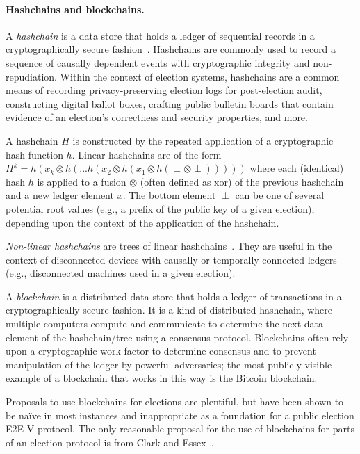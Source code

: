 \paragraph{Hashchains and blockchains.} A \emph{hashchain} is a data
store that holds a ledger of sequential records in a cryptographically
secure fashion~\cite{Haber90}. Hashchains are commonly used to record
a sequence of causally dependent events with cryptographic integrity
and non-repudiation. Within the context of election systems,
hashchains are a common means of recording privacy-preserving election
logs for post-election audit, constructing digital ballot boxes,
crafting public bulletin boards that contain evidence of an election's
correctness and security properties, and more.

A hashchain $H$ is constructed by the repeated application of a
cryptographic hash function $h$. Linear hashchains are of the form
$H^{k}=h(x_{k} \otimes h(...h(x_{2} \otimes h(x_{1} \otimes h(\perp
\otimes \perp)))))$
where each (identical) hash $h$ is applied to a fusion $\otimes$
(often defined as xor) of the previous hashchain and a new ledger
element $x$. The bottom element $\perp$ can be one of several
potential root values (e.g., a prefix of the public key of a given
election), depending upon the context of the application of the
hashchain. 

\emph{Non-linear hashchains} are trees of linear
hashchains~\cite{Benaloh91,Bayer93}. They are useful in the context of
disconnected devices with causally or temporally connected ledgers
(e.g., disconnected machines used in a given election).

A \emph{blockchain} is a distributed data store that holds a ledger of
transactions in a cryptographically secure fashion. It is a kind of
distributed hashchain, where multiple computers compute and
communicate to determine the next data element of the hashchain/tree
using a consensus protocol. Blockchains often rely upon a
cryptographic work factor to determine consensus and to prevent
manipulation of the ledger by powerful adversaries; the most publicly
visible example of a blockchain that works in this way is the Bitcoin
blockchain.~\cite{Bitcoin}

Proposals to use blockchains for elections are plentiful, but have
been shown to be na\"{i}ve in most instances and inappropriate as a
foundation for a public election E2E-V protocol. The only reasonable
proposal for the use of blockchains for parts of an election protocol
is from Clark and Essex~\cite{clark2012commitcoin}.

